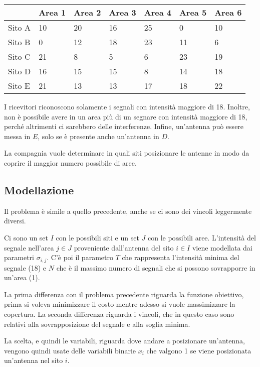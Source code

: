 \begin{table}[htbp]
	\centering
	\begin{tabular}{|l|l|l|l|l|l|l|}
		\hline
		& Area 1 & Area 2 & Area 3 & Area 4 & Area 5 & Area 6 \\ \hline
		Sito A & 10 & 20 & 16 & 25 & 0 & 10 \\ \hline
		Sito B & 0 & 12 & 18 & 23 & 11 & 6 \\ \hline
		Sito C & 21 & 8 & 5 & 6 & 23 & 19 \\ \hline
		Sito D & 16 & 15 & 15 & 8 & 14 & 18 \\ \hline
		Sito E & 21 & 13 & 13 & 17 & 18 & 22 \\ \hline
	\end{tabular}
\end{table}

\noindent I ricevitori riconoscono solamente i segnali con intensità maggiore di 18. Inoltre, non è possibile avere in un area più di un segnare con intensità maggiore di 18, perché altrimenti ci sarebbero delle interferenze. Infine, un'antenna può essere messa in $E$, solo se è presente anche un'antenna in $D$.

La compagnia vuole determinare in quali siti posizionare le antenne in modo da coprire il maggior numero possibile di aree.

\subsection{Modellazione}

Il problema è simile a quello precedente, anche se ci sono dei vincoli leggermente diversi.

Ci sono un set $I$ con le possibili siti e un set $J$ con le possibili aree.
L'intensità del segnale nell'area $j \in J$ proveniente dall'antenna del sito $i \in I$ viene modellata dai parametri $\sigma_{i,j}$. C'è poi il parametro $T$ che rappresenta l'intensità minima del segnale (18) e $N$ che è il massimo numero di segnali che si possono sovrapporre in un'area (1).

La prima differenza con il problema precedente riguarda la funzione obiettivo, prima si voleva minimizzare il costo mentre adesso si vuole massimizzare la copertura. La seconda differenza riguarda i vincoli, che in questo caso sono relativi alla sovrapposizione del segnale e alla soglia minima.

La scelta, e quindi le variabili, riguarda dove andare a posizionare un'antenna, vengono quindi usate delle variabili binarie $x_i$ che valgono 1 se viene posizionata un'antenna nel sito $i$.

